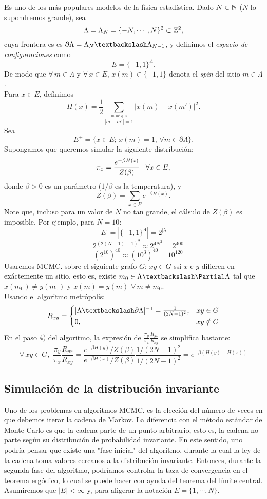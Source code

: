 \begin{ejemplo}
Es uno de los más populares modelos de la física estadística. Dado $N\in \mathbb N$ ($N$ lo supondremos grande), sea 
\[\Lambda = \Lambda_N = \{-N,\cdots,N\}^2 \subset \mathbb Z^2,\]
cuya frontera es es $\partial \Lambda =\Lambda_N \textbackslash \Lambda_{N-1}$, y definimos el \textit{espacio de configuraciones} como
\[E = \{-1,1\}^{\Lambda}.\]
De modo que $\forall\,m\in \Lambda$ y $\forall\,x\in E$, $x(m)\in \{-1,1\}$ denota el \textit{spin} del sitio $m\in \Lambda$.\\
Para $x\in E$, definimos 
\[H(x) = \frac{1}{2}\sum_{\overset{m,m'\in\Lambda}{|m-m'|=1} }|x(m)-x(m')|^2.\]
Sea
\[E^{+} = \{x \in E;\,x(m)=1,\,\forall m \in \partial \Lambda\}.\]
Supongamos que queremos simular la siguiente distribución:
\[\pi_x = \frac{e^{-\beta H(x)}}{Z(\beta)}\hspace{0.3cm}\forall x\in E,\]
donde $\beta >0$ es un parámetro ($1/\beta$ es la temperatura), y 
\[Z(\beta) = \sum_{x\in E}e^{-\beta H(x)}.\]
Note que, incluso para un valor de $N$ no tan grande, el cálsulo de $Z(\beta)$ es imposible. Por ejemplo, para $N=10$:
\[|E| = |\{-1,1\}^{\Lambda}| = 2^{|\lambda|}\]
\[= 2^{(2(N-1)+1)^2} \approx 2^{4N^2} = 2^{ 400}\]
\[=(2^{10})^{40} \approx (10^3)^{40} = 10^{120}\]
Usaremos MCMC. sobre el siguiente grafo $G$: $xy \in G$ ssi $x$ e $y$ difieren en exáctemente un sitio, esto es, existe $m_0 \in \Lambda \textbackslash \Partial \Lambda$ tal que $x(m_0) \neq y(m_0)$ y $x(m)=y(m)$ $\forall\,m\neq m_0$.\\
Usando el algoritmo metrópolis:
\[R_{xy} = \begin{cases}
|\Lambda \textbackslash \partial \Lambda |^{-1} = \frac{1}{(2N-1)^2}, & xy\in G\\
0, & xy \notin G
\end{cases}\]
En el paso $4)$ del algoritmo, la expresión de $\frac{\pi_y}{\pi_x}\frac{R_{yx}}{R_{xy}}$ se simplifica bastante:
\[\forall\,xy\in G,\,\,\frac{\pi_y}{\pi_x}\frac{R_{yx}}{R_{xy}} = \frac{e^{-\beta H(y)}/Z(\beta)}{e^{-\beta H(x)}/Z(\beta)} \frac{1/(2N-1)^{2}}{1/(2N-1)^{2}} = e^{-\beta(H(y)-H(x))}\]
\end{ejemplo}

\subsection{Simulación de la distribución invariante}
Uno de los problemas en algoritmos MCMC. es la elección del número de veces en que debemos iterar la cadena de Markov. La diferencia con el método estándar de Monte Carlo es que la cadena parte de un punto arbitrario, esto es, la cadena no parte según su distribución de probabilidad invariante. En este sentido, uno podría pensar que existe una "fase inicial" del algoritmo, durante la cual la ley de la cadena toma valores cercanos a la distribución invariante. Entonces, durante la segunda fase del algoritmo, podríamos controlar la taza de convergencia en el teorema ergódico, lo cual se puede hacer con ayuda del teorema del límite central. \\ Asumiremos que $|E| < \infty$ y, para aligerar la notación $E=\{1,\cdots,N\}$.

